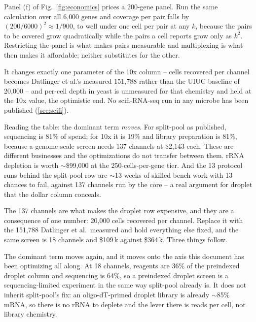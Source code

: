  Panel (f) of
Fig.~\ref{fig:economics} prices a 200-gene panel. Run the same calculation over
all 6{,}000 genes and coverage per pair falls by $(200/6000)^2\approx1/900$, to
well under one cell per pair at any $k$, because the pairs to be covered grow
quadratically while the pairs a cell reports grow only as $k^{2}$. Restricting
the panel is what makes pairs measurable and multiplexing is what then makes it
affordable; neither substitutes for the other.

It changes exactly one parameter of the 10x column -- cells recovered per channel
becomes Datlinger et al.'s measured 151{,}788 rather than the UIUC baseline of
20{,}000 -- and per-cell depth in yeast is unmeasured for that chemistry and held
at the 10x value, the optimistic end. No scifi-RNA-seq run in any microbe has
been published (\cref{sec:scifi}).

Reading the table: the dominant term \emph{moves}. For split-pool as published,
sequencing is 81\% of spend; for 10x it is 19\% and library preparation is 81\%,
because a genome-scale screen needs 137 channels at \$2{,}143 each. These are
different businesses and the optimizations do not transfer between them. rRNA
depletion is worth $\sim$\$99{,}000 at the 250-cells-per-gene tier. And the 13
protocol runs behind the split-pool row are $\sim$13 weeks of skilled bench work
with 13 chances to fail, against 137 channels run by the core -- a real
argument for droplet that the dollar column conceals.

 The 137 channels are what makes
the droplet row expensive, and they are a consequence of one number: 20{,}000
cells recovered per channel. Replace it with the 151{,}788 Datlinger et al.\
measured and hold everything else fixed, and the same screen is 18 channels and
\$109\,k against \$364\,k. Three things follow.

The dominant term moves again, and it moves onto the axis this document has been
optimizing all along. At 18 channels, reagents are 36\% of the preindexed droplet
column and sequencing is 64\%, so a preindexed droplet screen is a
sequencing-limited experiment in the same way split-pool already is. It does not
inherit split-pool's fix: an oligo-dT-primed droplet library is already
$\sim$85\% mRNA, so there is no rRNA to deplete and the lever there is reads per
cell, not library chemistry.

